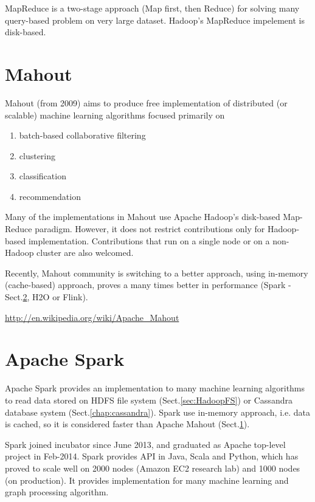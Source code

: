 MapReduce is a two-stage approach (Map first, then Reduce) for solving many
query-based problem on very large dataset. Hadoop's MapReduce impelement is
disk-based. 

\section{Mahout}
\label{sec:mahout}

Mahout (from 2009) aims to produce free implementation of distributed (or
scalable) machine learning algorithms focused primarily on 
\begin{enumerate}
  \item batch-based collaborative filtering
  \item clustering
  \item classification
  \item recommendation
\end{enumerate}
Many of the implementations in Mahout use Apache Hadoop's disk-based Map-Reduce
paradigm. However, it does not restrict contributions only for Hadoop-based
implementation. Contributions that run on a single node or on a  non-Hadoop
cluster are also welcomed. 

Recently, Mahout community is switching to  a better approach, using in-memory
(cache-based) approach, proves a many times better in performance (Spark -
Sect.\ref{sec:apache_spark}, H2O or Flink).




\url{http://en.wikipedia.org/wiki/Apache_Mahout}


\section{Apache Spark}
\label{sec:apache_spark}

Apache Spark provides an implementation to many machine learning algorithms to
read data stored on HDFS file system (Sect.\ref{sec:HadoopFS}) or Cassandra
database system (Sect.\ref{chap:cassandra}). 
Spark use in-memory approach, i.e. data is cached, so it is considered faster
than Apache Mahout (Sect.\ref{sec:mahout}).

Spark joined incubator since June 2013, and graduated as Apache top-level
project in Feb-2014. Spark provides API in Java, Scala and Python, which has
proved to scale well on 2000 nodes (Amazon EC2 research lab) and 1000 nodes (on
production). It provides implementation for many machine learning and graph
processing algorithm.



